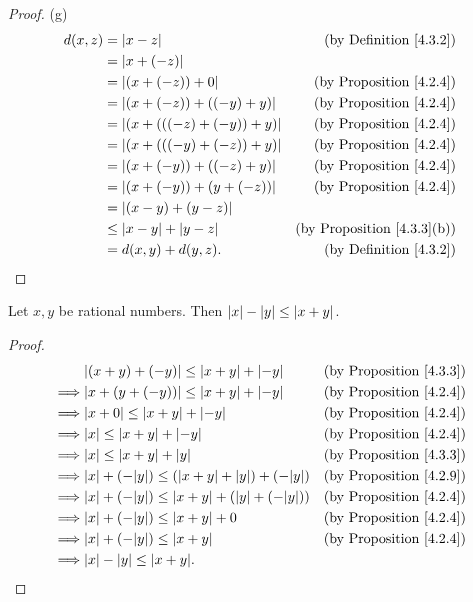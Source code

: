\begin{proof}{(g)}
\begin{align*}
d(x, z) &= \abs*{x - z} & \text{(by Definition \ref{4.3.2})} \\
&= \abs*{x + (-z)} \\
&= \abs*{(x + (-z)) + 0} & \text{(by Proposition \ref{4.2.4})} \\
&= \abs*{(x + (-z)) + ((-y) + y)} & \text{(by Proposition \ref{4.2.4})} \\
&= \abs*{(x + (((-z) + (-y)) + y)} & \text{(by Proposition \ref{4.2.4})} \\
&= \abs*{(x + (((-y) + (-z)) + y)} & \text{(by Proposition \ref{4.2.4})} \\
&= \abs*{(x + (-y)) + ((-z) + y)} & \text{(by Proposition \ref{4.2.4})} \\
&= \abs*{(x + (-y)) + (y + (-z))} & \text{(by Proposition \ref{4.2.4})} \\
&= \abs*{(x - y) + (y - z)} \\
&\leq \abs*{x - y} + \abs*{y - z} & \text{(by Proposition \ref{4.3.3}(b))} \\
&= d(x, y) + d(y, z). & \text{(by Definition \ref{4.3.2})} \\
\end{align*}
\end{proof}

\begin{additional corollary}\label{ac 4.3.1}
Let \(x, y\) be rational numbers.
Then \(\abs*{x} - \abs*{y} \leq \abs*{x + y}\).
\end{additional corollary}

\begin{proof}
\begin{align*}
& \abs*{(x + y) + (-y)} \leq \abs*{x + y} + \abs*{-y} & \text{(by Proposition \ref{4.3.3})} \\
\implies & \abs*{x + (y + (-y))} \leq \abs*{x + y} + \abs*{-y}& \text{(by Proposition \ref{4.2.4})} \\
\implies & \abs*{x + 0} \leq \abs*{x + y} + \abs*{-y}& \text{(by Proposition \ref{4.2.4})} \\
\implies & \abs*{x} \leq \abs*{x + y} + \abs*{-y}& \text{(by Proposition \ref{4.2.4})} \\
\implies & \abs*{x} \leq \abs*{x + y} + \abs*{y}& \text{(by Proposition \ref{4.3.3})} \\
\implies & \abs*{x} + (-\abs*{y}) \leq (\abs*{x + y} + \abs*{y}) + (-\abs*{y}) & \text{(by Proposition \ref{4.2.9})} \\
\implies & \abs*{x} + (-\abs*{y}) \leq \abs*{x + y} + (\abs*{y} + (-\abs*{y})) & \text{(by Proposition \ref{4.2.4})} \\
\implies & \abs*{x} + (-\abs*{y}) \leq \abs*{x + y} + 0 & \text{(by Proposition \ref{4.2.4})} \\
\implies & \abs*{x} + (-\abs*{y}) \leq \abs*{x + y} & \text{(by Proposition \ref{4.2.4})} \\
\implies & \abs*{x} - \abs*{y} \leq \abs*{x + y}.
\end{align*}
\end{proof}

